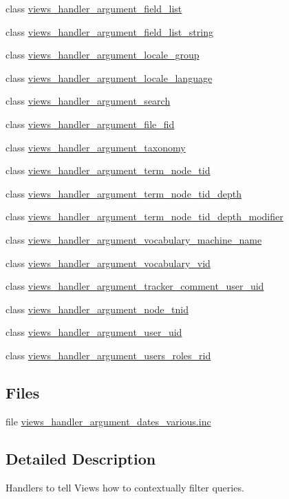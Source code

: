 \begin{DoxyCompactItemize}
class \hyperlink{classviews__handler__argument__field__list}{views\_\-handler\_\-argument\_\-field\_\-list}
\item 
class \hyperlink{classviews__handler__argument__field__list__string}{views\_\-handler\_\-argument\_\-field\_\-list\_\-string}
\item 
class \hyperlink{classviews__handler__argument__locale__group}{views\_\-handler\_\-argument\_\-locale\_\-group}
\item 
class \hyperlink{classviews__handler__argument__locale__language}{views\_\-handler\_\-argument\_\-locale\_\-language}
\item 
class \hyperlink{classviews__handler__argument__search}{views\_\-handler\_\-argument\_\-search}
\item 
class \hyperlink{classviews__handler__argument__file__fid}{views\_\-handler\_\-argument\_\-file\_\-fid}
\item 
class \hyperlink{classviews__handler__argument__taxonomy}{views\_\-handler\_\-argument\_\-taxonomy}
\item 
class \hyperlink{classviews__handler__argument__term__node__tid}{views\_\-handler\_\-argument\_\-term\_\-node\_\-tid}
\item 
class \hyperlink{classviews__handler__argument__term__node__tid__depth}{views\_\-handler\_\-argument\_\-term\_\-node\_\-tid\_\-depth}
\item 
class \hyperlink{classviews__handler__argument__term__node__tid__depth__modifier}{views\_\-handler\_\-argument\_\-term\_\-node\_\-tid\_\-depth\_\-modifier}
\item 
class \hyperlink{classviews__handler__argument__vocabulary__machine__name}{views\_\-handler\_\-argument\_\-vocabulary\_\-machine\_\-name}
\item 
class \hyperlink{classviews__handler__argument__vocabulary__vid}{views\_\-handler\_\-argument\_\-vocabulary\_\-vid}
\item 
class \hyperlink{classviews__handler__argument__tracker__comment__user__uid}{views\_\-handler\_\-argument\_\-tracker\_\-comment\_\-user\_\-uid}
\item 
class \hyperlink{classviews__handler__argument__node__tnid}{views\_\-handler\_\-argument\_\-node\_\-tnid}
\item 
class \hyperlink{classviews__handler__argument__user__uid}{views\_\-handler\_\-argument\_\-user\_\-uid}
\item 
class \hyperlink{classviews__handler__argument__users__roles__rid}{views\_\-handler\_\-argument\_\-users\_\-roles\_\-rid}
\end{DoxyCompactItemize}
\subsection*{Files}
\begin{DoxyCompactItemize}
\item 
file \hyperlink{views__handler__argument__dates__various_8inc}{views\_\-handler\_\-argument\_\-dates\_\-various.inc}
\end{DoxyCompactItemize}


\subsection{Detailed Description}
Handlers to tell Views how to contextually filter queries. 
